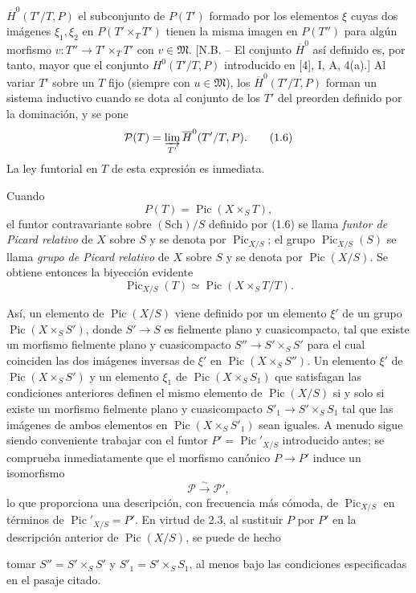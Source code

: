 \documentclass[11pt,twoside,openany]{book}
\numberwithin{equation}{section}
\newcommand{\src}[1]{%
  \phantomsection\hypertarget{src:#1}{}%
  \marginpar{\raggedleft\footnotesize\sffamily #1}%
}
\theoremstyle{plain}
\theoremstyle{definition}
\theoremstyle{remark}
\newcommand{\FgaUnitKey}{frontmatter}
\renewcommand{\src}[1]{%
  \phantomsection\hypertarget{src:\FgaUnitKey:#1}{}%
  \marginpar{\raggedleft\footnotesize\sffamily #1}%
}
\theoremstyle{plain}
\theoremstyle{definition}
\theoremstyle{remark}
\begin{document}
\src{145}
$\overline H^0(T'/T,P)$ el subconjunto de $P(T')$ formado por los elementos
$\xi$ cuyas dos imágenes $\xi_1,\xi_2$ en $P(T'\times_TT')$ tienen la misma
imagen en $P(T'')$ para algún morfismo
$v:T''\longrightarrow T'\times_TT'$ con $v\in\mathfrak M$. [N.B. -- El
conjunto $\overline H^0$ así definido es, por tanto, mayor que el conjunto
$H^0(T'/T,P)$ introducido en [4], I, A, 4(a).] Al variar $T'$ sobre un $T$ fijo
(siempre con $u\in\mathfrak M$), los $\overline H^0(T'/T,P)$ forman un sistema
inductivo cuando se dota al conjunto de los $T'$ del preorden definido por la
dominación, y se pone
\begin{equation}
\mathcal P(T)=\varinjlim_{T'}\overline H^0(T'/T,P).
\tag{1.6}
\end{equation}
La ley funtorial en $T$ de esta expresión es inmediata.

Cuando
\[
P(T)=\operatorname{Pic}(X\times_ST),
\]
el funtor contravariante sobre $(\mathrm{Sch})/S$ definido por (1.6) se llama
\emph{funtor de Picard relativo} de $X$ sobre $S$ y se denota por
$\operatorname{Pic}_{X/S}$; el grupo $\operatorname{Pic}_{X/S}(S)$ se llama
\emph{grupo de Picard relativo} de $X$ sobre $S$ y se denota por
$\operatorname{Pic}(X/S)$. Se obtiene entonces la biyección evidente
\begin{equation}
\operatorname{Pic}_{X/S}(T)\simeq\operatorname{Pic}(X\times_ST/T).
\tag{1.7}
\end{equation}

Así, un elemento de $\operatorname{Pic}(X/S)$ viene definido por un elemento
$\xi'$ de un grupo $\operatorname{Pic}(X\times_SS')$, donde
$S'\longrightarrow S$ es fielmente plano y cuasicompacto, tal que existe un
morfismo fielmente plano y cuasicompacto
$S''\longrightarrow S'\times_SS'$ para el cual coinciden las dos imágenes
inversas de $\xi'$ en $\operatorname{Pic}(X\times_SS'')$. Un elemento $\xi'$ de
$\operatorname{Pic}(X\times_SS')$ y un elemento $\xi_1$ de
$\operatorname{Pic}(X\times_SS_1)$ que satisfagan las condiciones anteriores
definen el mismo elemento de $\operatorname{Pic}(X/S)$ si y solo si existe un
morfismo fielmente plano y cuasicompacto
$S'_1\longrightarrow S'\times_SS_1$ tal que las imágenes de ambos elementos en
$\operatorname{Pic}(X\times_SS'_1)$ sean iguales. A menudo sigue siendo
conveniente trabajar con el funtor $P'=\operatorname{Pic}'_{X/S}$ introducido
antes; se comprueba inmediatamente que el morfismo canónico
$P\longrightarrow P'$ induce un isomorfismo
\begin{equation}
\mathcal P\xrightarrow{\sim}\mathcal P',
\tag{1.8}
\end{equation}
lo que proporciona una descripción, con frecuencia más cómoda, de
$\operatorname{Pic}_{X/S}$ en términos de
$\operatorname{Pic}'_{X/S}=P'$. En virtud de 2.3, al sustituir $P$ por $P'$ en
la descripción anterior de $\operatorname{Pic}(X/S)$, se puede de hecho
\src{146}
tomar $S''=S'\times_SS'$ y $S'_1=S'\times_SS_1$, al menos bajo las condiciones
especificadas en el pasaje citado.
\end{document}
